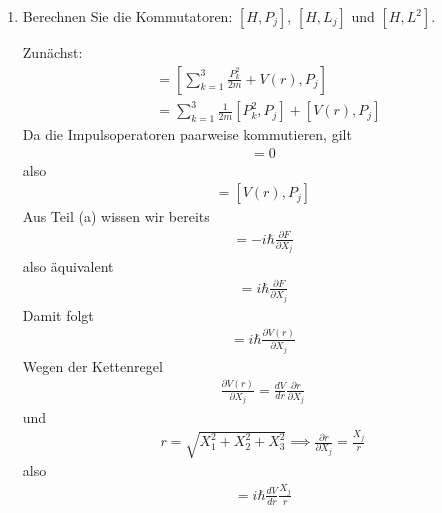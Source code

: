 \documentclass[11pt,a4paper]{scrartcl}
\begin{document}
\begin{enumerate}[label=(\alph*)]
\begin{tcolorbox}[title=Berechnung, breakable]
        Insgesamt:
        \begin{align*}
            [L_j,X_k] &= i\hbar \sum\limits_{m=1}^3 \epsilon_{jkm}X_m\\
            [L_j,P_k] &= i\hbar \sum\limits_{m=1}^3 \epsilon_{jkm}P_m\\
            [L_j,L_k] &= i\hbar \sum\limits_{m=1}^3 \epsilon_{jkm}L_m\\
            [L^2,L_j] &= 0
        \end{align*}
    \end{tcolorbox}

    \item Berechnen Sie die Kommutatoren: $[H,P_j]$, $[H,L_j]$ und $[H,L^2]$.
    \begin{tcolorbox}[title=Berechnung, breakable]
        Zunächst:
        \begin{align*}
            [H,P_j] &= \left[\sum\limits_{k=1}^3 \frac{P_k^2}{2m} + V(r),P_j\right]\\
            &= \sum\limits_{k=1}^3 \frac{1}{2m}[P_k^2,P_j] + [V(r),P_j]
        \end{align*}
        Da die Impulsoperatoren paarweise kommutieren, gilt
        \begin{align*}
            [P_k^2,P_j] = 0
        \end{align*}
        also
        \begin{align*}
            [H,P_j] = [V(r),P_j]
        \end{align*}
        Aus Teil (a) wissen wir bereits
        \begin{align*}
            [P_j,F(X_j)] = -i\hbar \frac{\partial F}{\partial X_j}
        \end{align*}
        also äquivalent
        \begin{align*}
            [F(X_1,X_2,X_3),P_j] = i\hbar \frac{\partial F}{\partial X_j}
        \end{align*}
        Damit folgt
        \begin{align*}
            [V(r),P_j] = i\hbar \frac{\partial V(r)}{\partial X_j}
        \end{align*}
        Wegen der Kettenregel
        \begin{align*}
            \frac{\partial V(r)}{\partial X_j} = \frac{dV}{dr}\frac{\partial r}{\partial X_j}
        \end{align*}
        und
        \begin{align*}
            r = \sqrt{X_1^2+X_2^2+X_3^2}
            \implies
            \frac{\partial r}{\partial X_j} = \frac{X_j}{r}
        \end{align*}
        also
        \begin{align*}
            [H,P_j] = i\hbar \frac{dV}{dr}\frac{X_j}{r}
        \end{align*}


\end{tcolorbox}
\end{enumerate}
\end{document}

